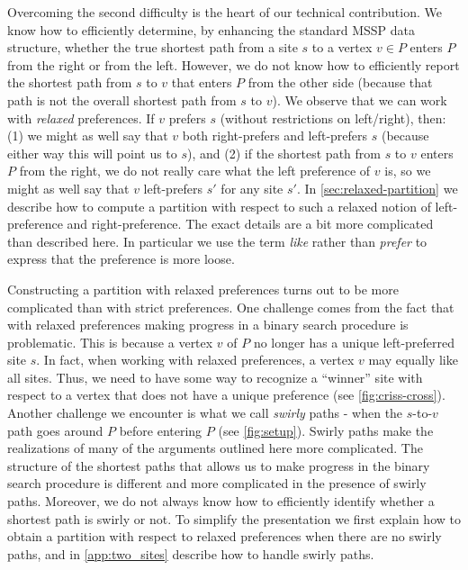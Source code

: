 \documentclass{article}
\begin{document}
Overcoming the second difficulty is the heart of our technical contribution.
We know how to efficiently determine,
by enhancing the standard MSSP data structure, whether the true shortest path from a site $s$ to a vertex $v \in P$ enters $P$ from the right or from the left.
However,
we do not know how to efficiently report the shortest path from $s$ to $v$ that enters $P$ from the other side (because that path is not the overall shortest path from $s$ to $v$).
We observe that we can work with {\em relaxed} preferences.
If $v$ prefers $s$ (without restrictions on left/right), then: (1) we might as well say that $v$ both right-prefers and left-prefers $s$ (because either way this will point us to $s$), and (2) if the shortest path from $s$ to $v$ enters $P$ from the right, we do not really care what the left preference of $v$ is, so we might as well say that $v$ left-prefers $s'$ for any site $s'$.
In \cref{sec:relaxed-partition} we describe how to compute a partition with respect to such a relaxed notion of left-preference and right-preference. The exact details are a bit more complicated than described here. In particular we use the term {\em like} rather than {\em prefer} to express that the preference is more loose.

Constructing a partition with relaxed preferences turns out to be more complicated than with strict preferences. One challenge comes from the fact that with relaxed preferences making progress in a binary search procedure is problematic. This is because a vertex $v$ of $P$ no longer has a unique left-preferred site $s$. In fact, when working with relaxed preferences, a vertex $v$ may equally like all sites.
Thus, we need to have some way to recognize a ``winner'' site with respect to a vertex that does not have a unique preference (see \cref{fig:criss-cross}).
Another challenge we encounter is what we call {\em swirly} paths - when the $s$-to-$v$ path goes around $P$ before entering $P$ (see \cref{fig:setup}).
Swirly paths make the realizations of many of the arguments outlined here more complicated.
The structure of the shortest paths that allows us to make progress in the binary search procedure is different and more complicated in the presence of swirly paths.
Moreover, we do not always know how to efficiently identify whether a shortest path is swirly or not.
To simplify the presentation we first explain how to obtain a partition with respect to relaxed preferences when there are no swirly paths, and in \cref{app:two_sites} describe how to handle swirly paths.
\end{document}
